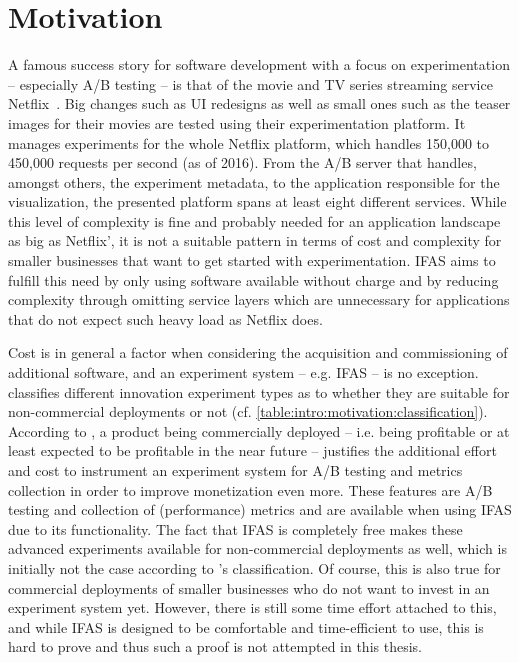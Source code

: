 
\section{Motivation}
\label{sec:intro:motivation}

A famous success story for software development with a focus on experimentation -- especially A/B testing -- is that of the movie and TV series streaming service Netflix~\cite{WEB:Netflix:2016}.
Big changes such as UI redesigns as well as small ones such as the teaser images for their movies are tested using their experimentation platform.
It manages experiments for the whole Netflix platform, which handles 150,000 to 450,000 requests per second (as of 2016).
From the A/B server that handles, amongst others, the experiment metadata, to the application responsible for the visualization, the presented platform spans at least eight different services.
While this level of complexity is fine and probably needed for an application landscape as big as Netflix', it is not a suitable pattern in terms of cost and complexity for smaller businesses that want to get started with experimentation.
\ac{IFAS} aims to fulfill this need by only using software available without charge and by reducing complexity through omitting service layers which are unnecessary for applications that do not expect such heavy load as Netflix does.

Cost is in general a factor when considering the acquisition and commissioning of additional software, and an experiment system -- e.g. \ac{IFAS} -- is no exception.
\citet{Bosch2012} classifies different innovation experiment types as to whether they are suitable for non-commercial deployments or not (cf. \cref{table:intro:motivation:classification}).
According to \citeauthor{Bosch2012}, a product being commercially deployed -- i.e. being profitable or at least expected to be profitable in the near future -- justifies the additional effort and cost to instrument an experiment system for A/B testing and metrics collection in order to improve monetization even more.
These features are A/B testing and collection of (performance) metrics and are available when using \ac{IFAS} due to its functionality.
The fact that \ac{IFAS} is completely free makes these advanced experiments available for non-commercial deployments as well, which is initially not the case according to \citeauthor{Bosch2012}'s classification.
Of course, this is also true for commercial deployments of smaller businesses who do not want to invest in an experiment system yet.
However, there is still some time effort attached to this, and while \ac{IFAS} is designed to be comfortable and time-efficient to use, this is hard to prove and thus such a proof is not attempted in this thesis.

